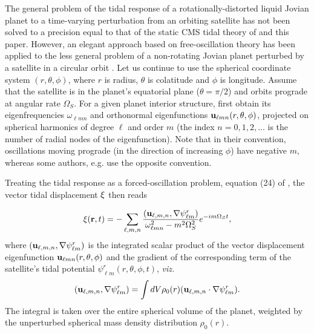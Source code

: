 The general problem of the tidal response of a rotationally-distorted liquid
Jovian planet to a time-varying perturbation from an orbiting satellite
has not been solved to a precision equal to that of the static CMS tidal
theory of \citet{wahl2016} and this paper.  However, an elegant approach
based on free-oscillation theory has been applied to the less general problem
of a non-rotating Jovian planet perturbed by a satellite in a circular orbit
\citep{vorontsov1984}.  Let us continue to use the spherical coordinate system $(r,\theta,\phi)$,
where $r$ is radius, $\theta$ is colatitude and $\phi$ is longitude.
Assume that the satellite is in the planet's equatorial
plane ($\theta=\pi/2$) and orbits prograde at angular rate $\Omega_S$.  For a given planet
interior structure, \citet{vorontsov1984} first obtain its eigenfrequencies
$\omega_{\ell m n}$ and orthonormal
eigenfunctions ${\bf u}_{\ell m n}(r,\theta,\phi)$, projected on spherical harmonics
of degree $\ell$ and order $m$ (the index $n=0,1,2,...$ is the number of radial nodes
of the eigenfunction).  Note that in their convention, oscillations moving prograde
(in the direction of increasing $\phi$) have negative $m$, whereas some authors, e.g.
\citet{Marley1993} use the opposite convention.

Treating the tidal response as a forced-oscillation problem, equation (24) of
\citet{vorontsov1984}, the vector tidal displacement ${\bf \xi}$ then reads

\begin{equation}
    {\bf \xi}({\bf r},t) = -\sum_{\ell,m,n} {{({\bf u}_{\ell,m,n},{\bf \nabla}\psi^r_{\ell m})}
\over {\omega^2_{\ell m n} - m^2 \Omega_S^2}} e^{-i m \Omega_S t},
\label{eq:xioft}
\end{equation}
where $({\bf u}_{\ell,m,n},{\bf \nabla} \psi^r_{\ell m})$ is the integrated scalar product of the
vector displacement eigenfunction ${\bf u}_{\ell m n}(r,\theta,\phi)$ and the
gradient of the corresponding term of the satellite's tidal potential
$\psi^r_{\ell m}(r,\theta,\phi,t)$, {\it viz.}
\begin{equation}
    ({\bf u}_{\ell,m,n},{\bf \nabla} \psi^r_{\ell m})=
\int dV \rho_0(r) ({\bf u}_{\ell,m,n} \cdot {\bf \nabla} \psi^r_{\ell m}).
\label{eq:scalprod}
\end{equation}
The integral is taken over the entire spherical volume of the planet,
weighted by the unperturbed spherical mass density distribution $\rho_0(r)$.

